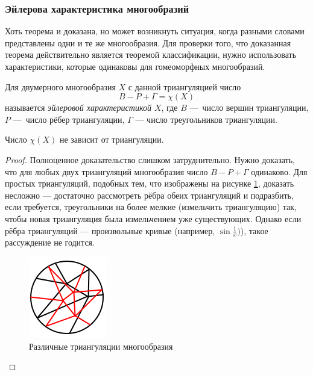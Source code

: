 \subsubsection{Эйлерова характеристика многообразий}

\begin{remark}
    Хоть теорема и доказана, но может возникнуть ситуация, когда разными словами представлены одни и те же многообразия. Для проверки того, что доказанная теорема действительно является теоремой классификации, нужно использовать характеристики, которые одинаковы для гомеоморфных многообразий.
\end{remark}

\begin{definition}
    Для двумерного многообразия $X$ с данной триангуляцией число
    \[B - P + \Gamma = \chi(X)\]
    называется \textit{эйлеровой характеристикой $X$}, где $B$ — число вершин триангуляции, $P$ — число рёбер триангуляции, $\Gamma$ — число треугольников триангуляции.
\end{definition} 

\begin{theorem}
    Число $\chi(X)$ не зависит от триангуляции.
\end{theorem} 
\begin{proof}
    Полноценное доказательство слишком затруднительно. Нужно доказать, что для любых двух триангуляций многообразия число $B - P + \Gamma$ одинаково. Для простых триангуляций, подобных тем, что изображены на рисунке \ref{fig:c11.1}, доказать несложно — достаточно рассмотреть рёбра обеих триангуляций и подразбить, если требуется, треугольники на более мелкие (измельчить триангуляцию) так, чтобы новая триангуляция была измельчением уже существующих. Однако если рёбра триангуляций — произвольные кривые (например, $\sin{\frac{1}x})$), такое рассуждение не годится.

    \begin{figure}[htbp]
        \centering
        \includegraphics[scale=0.7]{images/c11.1.png}
        \caption{Различные триангуляции многообразия}
        \label{fig:c11.1}
    \end{figure}
\end{proof} 


